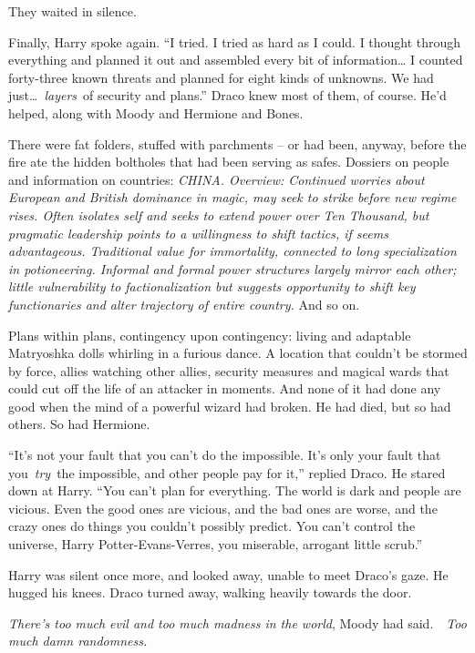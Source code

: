They waited in silence.

Finally, Harry spoke again. ``I tried. I tried as hard as I could. I
thought through everything and planned it out and assembled every bit of
information\ldots{} I counted forty-three known threats and planned for
eight kinds of unknowns. We had just\ldots~\emph{layers}~of security and
plans.'' Draco knew most of them, of course. He'd helped, along with
Moody and Hermione and Bones.

There were fat folders, stuffed with parchments -- or had been, anyway,
before the fire ate the hidden boltholes that had been serving as safes.
Dossiers on people and information on countries: \emph{CHINA. Overview:
Continued worries about European and British dominance in magic, may
seek to strike before new regime rises. Often isolates self and seeks to
extend power over Ten Thousand, but pragmatic leadership points to a
willingness to shift tactics, if seems advantageous. Traditional value
for immortality, connected to long specialization in potioneering.
Informal and formal power structures largely mirror each other; little
vulnerability to factionalization but suggests opportunity to shift key
functionaries and alter trajectory of entire country.} And so on.

Plans within plans, contingency upon contingency: living and adaptable
Matryoshka dolls whirling in a furious dance. A location that couldn't
be stormed by force, allies watching other allies, security measures and
magical wards that could cut off the life of an attacker in moments. And
none of it had done any good when the mind of a powerful wizard had
broken. He had died, but so had others. So had Hermione.

``It's not your fault that you can't do the impossible. It's only your
fault that you~\emph{try}~the impossible, and other people pay for it,''
replied Draco. He stared down at Harry. ``You can't plan for everything.
The world is dark and people are vicious. Even the good ones are
vicious, and the bad ones are worse, and the crazy ones do things you
couldn't possibly predict. You can't control the universe, Harry
Potter-Evans-Verres, you miserable, arrogant little scrub.''

Harry was silent once more, and looked away, unable to meet Draco's
gaze. He hugged his knees. Draco turned away, walking heavily towards
the door.

\emph{There's too much evil and too much madness in the world}, Moody
had said.~~\emph{Too much damn randomness.}

